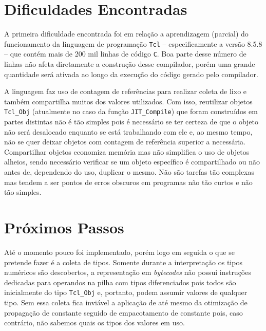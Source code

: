 


\section{Dificuldades Encontradas}

A primeira dificuldade encontrada foi em relação a aprendizagem
(parcial) do funcionamento da linguagem de programação \texttt{Tcl} --
especificamente a versão 8.5.8 --
que contém mais de 200 mil linhas de código \texttt{C}. Boa parte
desse número de linhas não afeta diretamente a construção desse
compilador, porém uma grande quantidade será ativada
ao longo da execução do código gerado pelo compilador.

A linguagem faz uso de contagem de referências para realizar coleta de
lixo e também compartilha muitos dos valores utilizados. Com isso,
reutilizar objetos \verb!Tcl_Obj! (atualmente no caso da função
\verb!JIT_Compile!) que foram construídos em partes distintas não é tão
simples pois é necessário se ter certeza de que o objeto não será
desalocado enquanto se está trabalhando com ele e, ao mesmo tempo, não
se quer deixar objetos com contagem de referência superior a
necessária. Compartilhar objetos economiza memória mas não simplifica
o uso de objetos alheios, sendo necessário verificar se um objeto
específico é compartilhado ou não antes de, dependendo do uso,
duplicar o mesmo. Não são tarefas tão complexas mas tendem a ser
pontos de erros obscuros em programas não tão curtos e não tão simples.



\section{Próximos Passos}

Até o momento pouco foi implementado, porém logo em seguida o que se pretende
fazer é a coleta de tipos. Somente durante a interpretação os
tipos numéricos são descobertos, a representação em \textit{bytecodes}
não possui instruções dedicadas para operandos na pilha com tipos
diferenciados pois todos são inicialmente do tipo \verb!Tcl_Obj! e,
portanto, podem assumir valores de qualquer tipo. Sem essa
coleta fica inviável a
aplicação de até mesmo da otimização de propagação de constante
seguido de empacotamento de constante pois, caso contrário, não
sabemos quais os tipos dos valores em uso.

